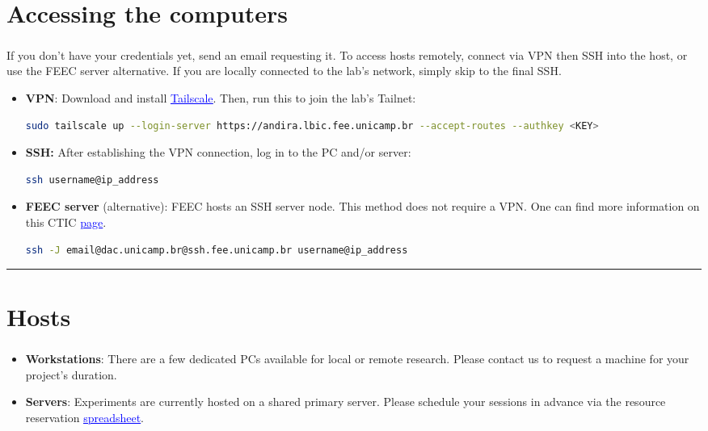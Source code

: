 \documentclass[a4paper, landscape]{article}
\begin{document}
\begin{multicols}{2}
\section*{Accessing the computers}
\label{sec:org3a7b1eb}
\vspace{-2mm}
If you don't have your credentials yet, send an email\textsuperscript{\dag}  requesting it. To access hosts remotely, connect via VPN then SSH into the host, or use the FEEC server alternative. If you are locally connected to the lab's network, simply skip to the final SSH.
\begin{itemize}
\item \textbf{VPN}: Download and install \href{https://tailscale.com/download}{\textcolor{blue}{\uline{Tailscale}}}. Then, run this to join the lab's Tailnet:
\begin{lstlisting}[language=sh,numbers=none,basicstyle=\fontsize{7pt}{8.5pt}\ttfamily]
sudo tailscale up --login-server https://andira.lbic.fee.unicamp.br --accept-routes --authkey <KEY>
\end{lstlisting}
\vspace{-1mm}
\item \textbf{SSH:} After establishing the VPN connection, log in to the PC and/or server:
\begin{lstlisting}[language=sh,numbers=none]
ssh username@ip_address
\end{lstlisting}
\vspace{-1mm}
\item \textbf{FEEC server} (alternative): FEEC hosts an SSH server node. This method does not require a VPN. One can find more information on this CTIC \href{https://site.fee.unicamp.br/ctic/configuracao-de-sshfeeunicampbr-como-jump-host}{\textcolor{blue}{\uline{page}}}.
\begin{lstlisting}[language=sh,numbers=none]
ssh -J email@dac.unicamp.br@ssh.fee.unicamp.br username@ip_address
\end{lstlisting}
\end{itemize}
\vspace{-0.75em}\noindent\rule{\linewidth}{0.4pt}\vspace{-1.25em}
\section*{Hosts}
\label{sec:orge9ca4f4}
\vspace{-2mm}
\begin{itemize}
\item \textbf{Workstations}: There are a few dedicated PCs available for local or remote research. Please contact us\textsuperscript{\dag} to request a machine for your project's duration.
\item \textbf{Servers}: Experiments are currently hosted on a shared primary server. Please schedule your sessions in advance via the resource reservation \href{https://docs.google.com/spreadsheets/d/1Lhi5pEze4d4Z4oHMksUpD3k6n5Hp26gXtOMGz6sXr9A/edit?usp=sharing}{\textcolor{blue}{\uline{spreadsheet}}}.
\end{itemize}


\end{multicols}
\end{document}
